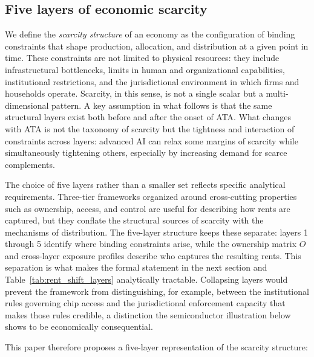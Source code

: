 \documentclass[11pt]{article}
\begin{document}
\subsection{Five layers of economic scarcity}
\label{subsec:five_layers}

We define the \emph{scarcity structure} of an economy as the configuration of binding constraints that shape production, allocation, and distribution at a given point in time. These constraints are not limited to physical resources: they include infrastructural bottlenecks, limits in human and organizational capabilities, institutional restrictions, and the jurisdictional environment in which firms and households operate. Scarcity, in this sense, is not a single scalar but a multi-dimensional pattern. A key assumption in what follows is that the same structural layers exist both before and after the onset of ATA. What changes with ATA is not the taxonomy of scarcity but the tightness and interaction of constraints across layers: advanced AI can relax some margins of scarcity while simultaneously tightening others, especially by increasing demand for scarce complements.

The choice of five layers rather than a smaller set reflects specific analytical requirements. Three-tier frameworks organized around cross-cutting properties such as ownership, access, and control are useful for describing how rents are captured, but they conflate the structural sources of scarcity with the mechanisms of distribution. The five-layer structure keeps these separate: layers 1 through 5 identify where binding constraints arise, while the ownership matrix $O$ and cross-layer exposure profiles describe who captures the resulting rents. This separation is what makes the formal statement in the next section and Table~\ref{tab:rent_shift_layers} analytically tractable. Collapsing layers would prevent the framework from distinguishing, for example, between the institutional rules governing chip access and the jurisdictional enforcement capacity that makes those rules credible, a distinction the semiconductor illustration below shows to be economically consequential.

This paper therefore proposes a five-layer representation of the scarcity structure:
\end{document}
